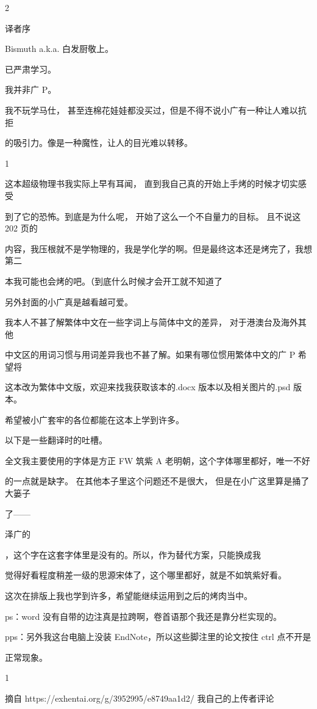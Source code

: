 2\par
译者序\par
Bismuth a.k.a. 白发厨敬上。\par
已严肃学习。\par
我并非广 P。\par
我不玩学马仕， 甚至连棉花娃娃都没买过，但是不得不说小广有一种让人难以抗拒\par
的吸引力。像是一种魔性，让人的目光难以转移。\par
1\par
这本超级物理书我实际上早有耳闻， 直到我自己真的开始上手烤的时候才切实感受\par
到了它的恐怖。到底是为什么呢， 开始了这么一个不自量力的目标。 且不说这202 页的\par
内容，我压根就不是学物理的，我是学化学的啊。但是最终这本还是烤完了，我想第二\par
本我可能也会烤的吧。（到底什么时候才会开工就不知道了\par
另外封面的小广真是越看越可爱。\par
我本人不甚了解繁体中文在一些字词上与简体中文的差异， 对于港澳台及海外其他\par
中文区的用词习惯与用词差异我也不甚了解。如果有哪位惯用繁体中文的广 P 希望将\par
这本改为繁体中文版，欢迎来找我获取该本的.docx 版本以及相关图片的.psd 版本。\par
希望被小广套牢的各位都能在这本上学到许多。\par
以下是一些翻译时的吐槽。\par
全文我主要使用的字体是方正 FW 筑紫 A 老明朝，这个字体哪里都好，唯一不好\par
的一点就是缺字。 在其他本子里这个问题还不是很大， 但是在小广这里算是捅了大篓子\par
了——\par
泽广的\par
，这个字在这套字体里是没有的。所以，作为替代方案，只能换成我\par
觉得好看程度稍差一级的思源宋体了，这个哪里都好，就是不如筑紫好看。\par
这次在排版上我也学到许多，希望能继续运用到之后的烤肉当中。\par
ps：word 没有自带的边注真是拉跨啊，卷首语那个我还是靠分栏实现的。\par
pps：另外我这台电脑上没装 EndNote，所以这些脚注里的论文按住 ctrl 点不开是\par
正常现象。\par
1\par
摘自 https://exhentai.org/g/3952995/e8749aa1d2/ 我自己的上传者评论\par

